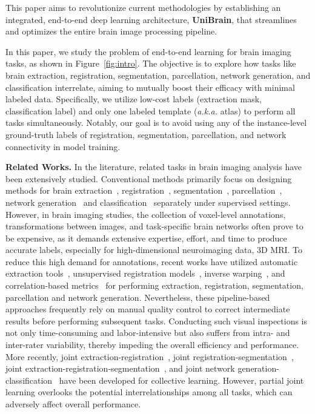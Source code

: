 
This paper aims to revolutionize current methodologies by establishing an integrated, end-to-end deep learning architecture, \textbf{UniBrain}, that streamlines and optimizes the entire brain image processing pipeline. 

In this paper, we study the problem of end-to-end learning for brain imaging tasks, as shown in Figure~\ref{fig:intro}. 
The objective is to explore how tasks like brain extraction, registration, segmentation, parcellation, network generation, and classification interrelate, aiming to mutually boost their efficacy with minimal labeled data. Specifically, we utilize low-cost labels (\ie extraction mask, classification label) and only one labeled template (\emph{a.k.a.} atlas) to perform all tasks simultaneously. Notably, our goal is to avoid using any of the instance-level ground-truth labels of registration, segmentation, parcellation, and network connectivity in model training.

\noindent\textbf{Related Works.} 
In the literature, related tasks in brain imaging analysis have been extensively studied. Conventional methods primarily focus on designing methods for brain extraction~\cite{kleesiek2016deep,lucena2019convolutional}, registration~\cite{sokooti2017nonrigid, su2022abn}, segmentation~\cite{akkus2017deep, kamnitsas2017efficient, chen2018voxresnet}, parcellation~\cite{thyreau2020learning,lim2022deepparcellation}, network generation~\cite{zhou2020toolbox,vskoch2022human} and classification~\cite{li2021braingnn,kawahara2017brainnetcnn, kan2022brain} separately under supervised settings. However, in brain imaging studies, the collection of voxel-level annotations, transformations between images, and task-specific brain networks often prove to be expensive, as it demands extensive expertise, effort, and time to produce accurate labels, especially for high-dimensional neuroimaging data, \eg 3D MRI. To reduce this high demand for annotations, recent works have utilized automatic extraction tools~\cite{smith2002fast,cox1996afni,shattuck2002brainsuite, segonne2004hybrid}, unsupervised registration models~\cite{balakrishnan2018unsupervised,su2022abn}, inverse warping~\cite{jaderberg2015spatial}, and correlation-based metrics~\cite{liang2012effects} for performing extraction, registration, segmentation, parcellation and network generation. Nevertheless, these pipeline-based approaches frequently rely on manual quality control to correct intermediate results before performing subsequent tasks. Conducting such visual inspections is not only time-consuming and labor-intensive but also suffers from intra- and inter-rater variability, thereby impeding the overall efficiency and performance. More recently, joint extraction-registration~\cite{su2022ernet}, joint registration-segmentation~\cite{xu2019deepatlas}, joint extraction-registration-segmentation~\cite{su2023one}, and joint network generation-classification~\cite{kan2022fbnetgen} have been developed for collective learning. However, partial joint learning overlooks the potential interrelationships among all tasks, which can adversely affect overall performance. 

